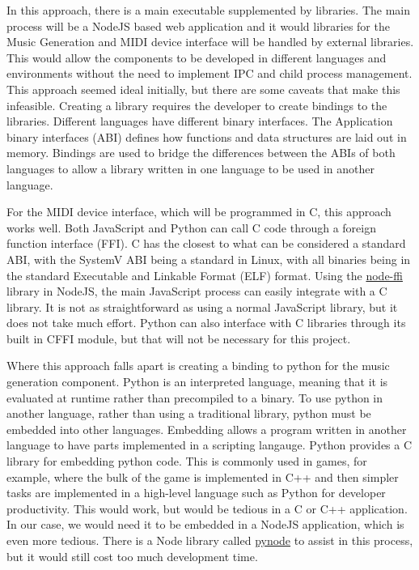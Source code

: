 In this approach, there is a main executable supplemented by libraries. The main process
will be a NodeJS based web application and it would libraries for the Music Generation and
MIDI device interface will be handled by external libraries. This would allow the
components to be developed in different languages and environments without the need to
implement IPC and child process management. This approach seemed ideal initially, but
there are some caveats that make this infeasible. Creating a library requires the
developer to create bindings to the libraries. Different languages have different binary
interfaces. The Application binary interfaces (ABI) defines how functions and data
structures are laid out in memory. Bindings are used to bridge the differences between the
ABIs of both languages to allow a library written in one language to be used in another
language.

For the MIDI device interface, which will be programmed in C, this approach works well.
Both JavaScript and Python can call C code through a foreign function interface (FFI). C
has the closest to what can be considered a standard ABI, with the SystemV ABI being a
standard in Linux, with all binaries being in the standard Executable and Linkable Format
(ELF) format. Using the \url{node-ffi} library in NodeJS, the main JavaScript process can
easily integrate with a C library. It is not as straightforward as using a normal
JavaScript library, but it does not take much effort. Python can also interface with C
libraries through its built in CFFI module, but that will not be necessary for this
project.

Where this approach falls apart is creating a binding to python for the music generation
component. Python is an interpreted language, meaning that it is evaluated at runtime
rather than precompiled to a binary. To use python in another language, rather than using
a traditional library, python must be embedded into other languages. Embedding allows a
program written in another language to have parts implemented in a scripting langauge.
Python provides a C library for embedding python code. This is commonly used in games, for
example, where the bulk of the game is implemented in C++ and then simpler tasks are
implemented in a high-level language such as Python for developer productivity. This would
work, but would be tedious in a C or C++ application. In our case, we would need it to be
embedded in a NodeJS application, which is even more tedious. There is a Node library
called \url{pynode} to assist in this process, but it would still cost too much
development time.

